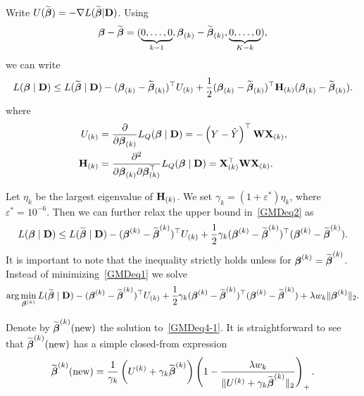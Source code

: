 Write $U(\widetilde{\boldsymbol{\beta}})=-\nabla L(\widetilde{\boldsymbol{\beta}}|\textbf{D})$. Using
\[
\boldsymbol{\beta}-\widetilde{\boldsymbol{\beta}}=(\underbrace{0,\ldots,0}_{k-1},\boldsymbol{\beta}_{(k)}-\widetilde{\boldsymbol{\beta}}_{(k)},\underbrace{0,\ldots,0}_{K-k}),
\]
we can write
\begin{equation}
L(\boldsymbol{\beta}\mid\textbf{D})\le L(\widetilde{\boldsymbol{\beta}}\mid\textbf{D})-(\boldsymbol{\beta}_{(k)}-\widetilde{\boldsymbol{\beta}}_{(k)})^{\top}U_{(k)}+\frac{1}{2}(\boldsymbol{\beta}_{(k)}-\widetilde{\boldsymbol{\beta}}_{(k)})^{\top}\textbf{H}_{(k)}(\boldsymbol{\beta}_{(k)}-\widetilde{\boldsymbol{\beta}}_{(k)}).\label{GMDeq2}
\end{equation}
where
\begin{align}
U_{(k)} & =\frac{\partial}{\partial\boldsymbol{\beta}_{(k)}}L_{Q}(\boldsymbol{\beta}\mid\textbf{D})=-\left(Y-\hat{Y}\right)^{\top}\mathbf{W}\mathbf{X}_{(k)},\label{eq:gradientj-1}\\
\mathbf{H}_{(k)} & =\frac{\partial^{2}}{\partial\boldsymbol{\beta}_{(k)}\partial\boldsymbol{\beta}_{(k)}^{\top}}L_{Q}(\boldsymbol{\beta}\mid\textbf{D})=\mathbf{X}_{(k)}^{\top}\mathbf{W}\mathbf{X}_{(k)}.\label{eq:hessianj-1}
\end{align}

Let $\eta_{k}$ be the largest eigenvalue of $\textbf{H}_{(k)}$. We set $\gamma_{k}=(1+\varepsilon^{*})\eta_{k}$, where $\varepsilon^{*}=10^{-6}$. Then we can further relax the upper bound in~\eqref{GMDeq2} as
\begin{equation}
L(\boldsymbol{\beta}\mid\textbf{D})\leq L(\widetilde{\boldsymbol{\beta}}\mid\textbf{D})-(\boldsymbol{\beta}^{(k)}-\widetilde{\boldsymbol{\beta}}^{(k)})^{\top}U_{(k)}+\frac{1}{2}\gamma_{k}(\boldsymbol{\beta}^{(k)}-\widetilde{\boldsymbol{\beta}}^{(k)})^{\top}(\boldsymbol{\beta}^{(k)}-\widetilde{\boldsymbol{\beta}}^{(k)}).\label{GMDeq3-1}
\end{equation}
It is important to note that the inequality strictly holds unless for $\boldsymbol{\beta}^{(k)}=\widetilde{\boldsymbol{\beta}}^{(k)}$. Instead of minimizing~\eqref{GMDeq1} we solve
\begin{equation}
\arg\min_{\boldsymbol{\beta}^{(k)}}L(\widetilde{\boldsymbol{\beta}}\mid\textbf{D})-(\boldsymbol{\beta}^{(k)}-\widetilde{\boldsymbol{\beta}}^{(k)})^{\top}U_{(k)}+\frac{1}{2}\gamma_{k}(\boldsymbol{\beta}^{(k)}-\widetilde{\boldsymbol{\beta}}^{(k)})^{\top}(\boldsymbol{\beta}^{(k)}-\widetilde{\boldsymbol{\beta}}^{(k)})+\lambda w_{k}\Vert\boldsymbol{\beta}^{(k)}\Vert_{2}.\label{GMDeq4-1}
\end{equation}

Denote by $\widetilde{\boldsymbol{\beta}}^{(k)}(\textrm{new})$ the solution to~\eqref{GMDeq4-1}. It is straightforward to see that $\widetilde{\boldsymbol{\beta}}^{(k)}(\textrm{new})$ has a simple closed-from expression
\begin{equation}
\widetilde{\boldsymbol{\beta}}^{(k)}(\textrm{new})=\frac{1}{\gamma_{k}}\left(U^{(k)}+\gamma_{k}\widetilde{\boldsymbol{\beta}}^{(k)}\right)\left(1-\frac{\lambda w_{k}}{\Vert U^{(k)}+\gamma_{k}\widetilde{\boldsymbol{\beta}}^{(k)}\Vert_{2}}\right)_{+}.\label{GMDeq5-1}
\end{equation}

